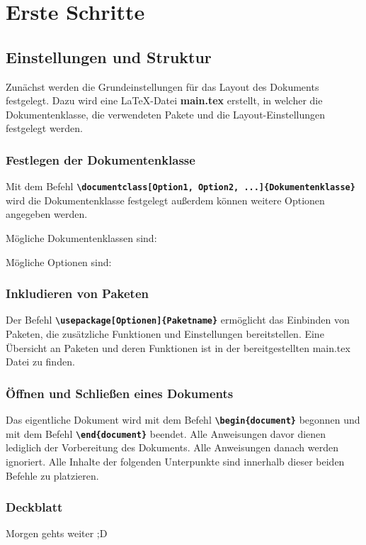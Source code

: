 \section{Erste Schritte}
\subsection{Einstellungen und Struktur}

Zunächst werden die Grundeinstellungen für das Layout des Dokuments festgelegt. Dazu wird eine LaTeX-Datei \textbf{main.tex} erstellt, in welcher die Dokumentenklasse, die verwendeten Pakete und die Layout-Einstellungen festgelegt werden.

\subsubsection{Festlegen der Dokumentenklasse}
Mit dem Befehl \textbf{\texttt{\textbackslash documentclass[Option1, Option2, ...]\{Dokumentenklasse\}}} wird die Dokumentenklasse festgelegt außerdem können weitere Optionen angegeben werden.

Mögliche Dokumentenklassen sind:


Mögliche Optionen sind:



\subsubsection{Inkludieren von Paketen}
Der Befehl \textbf{\texttt{\textbackslash usepackage[Optionen]\{Paketname\}}} ermöglicht das Einbinden von Paketen, die zusätzliche Funktionen und Einstellungen bereitstellen.
Eine Übersicht an Paketen und deren Funktionen ist in der bereitgestellten main.tex Datei zu finden.

\subsubsection{Öffnen und Schließen eines Dokuments}
Das eigentliche Dokument wird mit dem Befehl \textbf{\texttt{\textbackslash begin\{document\}}} begonnen und mit dem Befehl \textbf{\texttt{\textbackslash end\{document\}}} beendet.
Alle Anweisungen davor dienen lediglich der Vorbereitung des Dokuments. Alle Anweisungen danach werden ignoriert. Alle Inhalte der folgenden Unterpunkte sind innerhalb dieser beiden Befehle zu platzieren.

\subsubsection{Deckblatt}
Morgen gehts weiter ;D



